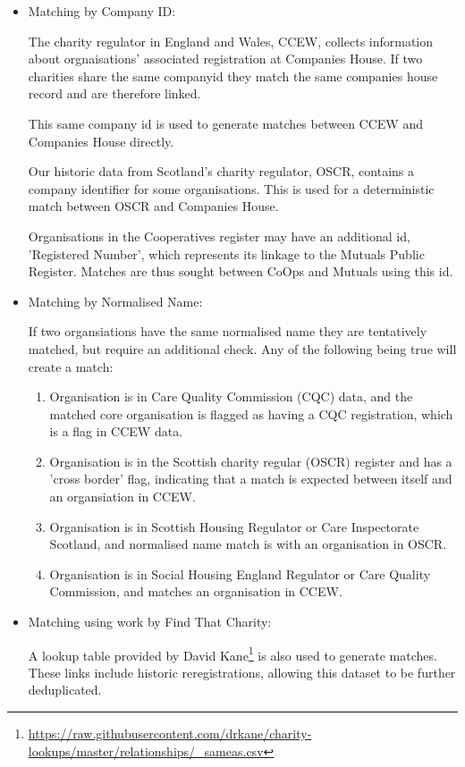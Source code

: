 \documentclass{article}
\begin{document}
\begin{itemize}
\item Matching by Company ID:

The charity regulator in England and Wales, CCEW, collects information about orgnaisations' associated registration at Companies House. 
If two charities share the same companyid they match the same companies house record and are therefore linked.

This same company id is used to generate matches between CCEW and Companies House directly.

Our historic data from Scotland's charity regulator, OSCR, contains a company identifier for some organisations. This is used
for a deterministic match between OSCR and Companies House.

Organisations in the Cooperatives register may have an additional id, 'Registered Number', which represents its linkage to 
the Mutuals Public Register. Matches are thus sought between CoOps and Mutuals using this id.



\item Matching by Normalised Name:

If two organsiations have the same normalised name they are tentatively matched, but require an additional check. 
Any of the following being true will create a match:

  \begin{enumerate}

  \item Organisation is in Care Quality Commission (CQC) data, and the matched core organisation is flagged as having a CQC registration, 
  which is a flag in CCEW data.
  \item Organisation is in the Scottish charity regular (OSCR) register and has a 'cross border' flag, 
  indicating that a match is expected between itself and an organsiation in CCEW.
  \item Organisation is in Scottish Housing Regulator or Care Inspectorate Scotland, and normalised name match is with an organisation in OSCR.
  \item Organisation is in Social Housing England Regulator or Care Quality Commission, and matches an organisation in CCEW.
  \end{enumerate}


\item Matching using work by Find That Charity:

A lookup table provided by David Kane\footnote{\url{https://raw.githubusercontent.com/drkane/charity-lookups/master/relationships/_sameas.csv}} is also used to generate matches. 
These links include historic reregistrations, allowing
this dataset to be further deduplicated.
\end{itemize}
\end{document}
